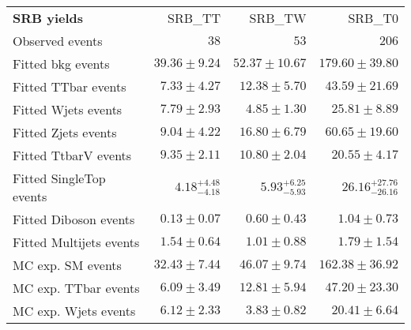 

\begin{table}
\begin{center}
\setlength{\tabcolsep}{0.0pc}
{\small
\begin{tabular*}{\textwidth}{@{\extracolsep{\fill}}lrrr}
\noalign{\smallskip}\hline\noalign{\smallskip}
{\bf SRB yields}           & SRB\_TT            & SRB\_TW            & SRB\_T0              \\[-0.05cm]
\noalign{\smallskip}\hline\noalign{\smallskip}
Observed events          & $38$              & $53$              & $206$                    \\
\noalign{\smallskip}\hline\noalign{\smallskip}
Fitted bkg events         & $39.36 \pm 9.24$          & $52.37 \pm 10.67$          & $179.60 \pm 39.80$              \\
\noalign{\smallskip}\hline\noalign{\smallskip}
        Fitted TTbar events         & $7.33 \pm 4.27$          & $12.38 \pm 5.70$          & $43.59 \pm 21.69$              \\
        Fitted Wjets events         & $7.79 \pm 2.93$          & $4.85 \pm 1.30$          & $25.81 \pm 8.89$              \\
        Fitted Zjets events         & $9.04 \pm 4.22$          & $16.80 \pm 6.79$          & $60.65 \pm 19.60$              \\
        Fitted TtbarV events         & $9.35 \pm 2.11$          & $10.80 \pm 2.04$          & $20.55 \pm 4.17$              \\
        Fitted SingleTop events         & $4.18_{-4.18}^{+4.48}$          & $5.93_{-5.93}^{+6.25}$          & $26.16_{-26.16}^{+27.76}$              \\
        Fitted Diboson events         & $0.13 \pm 0.07$          & $0.60 \pm 0.43$          & $1.04 \pm 0.73$              \\
        Fitted Multijets events         & $1.54 \pm 0.64$          & $1.01 \pm 0.88$          & $1.79 \pm 1.54$              \\
 \noalign{\smallskip}\hline\noalign{\smallskip}
MC exp. SM events              & $32.43 \pm 7.44$          & $46.07 \pm 9.74$          & $162.38 \pm 36.92$              \\
\noalign{\smallskip}\hline\noalign{\smallskip}
        MC exp. TTbar events         & $6.09 \pm 3.49$          & $12.81 \pm 5.94$          & $47.20 \pm 23.30$              \\
        MC exp. Wjets events         & $6.12 \pm 2.33$          & $3.83 \pm 0.82$          & $20.41 \pm 6.64$              \\

\end{tabular*}}
\end{center}
\end{table}
